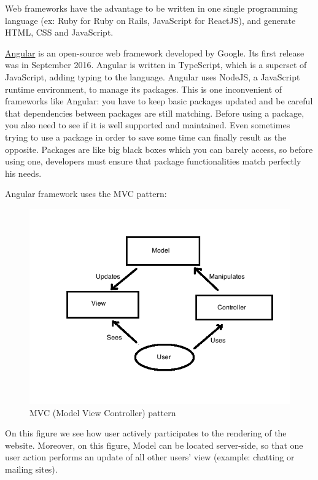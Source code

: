 \documentclass{article}
\begin{document}
                        Web frameworks have the advantage to be written in one single programming language (ex: Ruby for Ruby on Rails, JavaScript for ReactJS),
                        and generate HTML, CSS and JavaScript. \newline
                        

                        \href{https://angular.io/}{Angular} is an open-source web framework developed by Google. Its first release was
                        in September 2016. Angular is written in TypeScript, which is a superset of JavaScript, adding typing to the language.
                        Angular uses NodeJS, a JavaScript runtime environment, to manage its packages.
                        This is one inconvenient of frameworks like Angular: you have to keep basic packages updated and be careful that dependencies
                        between packages are still matching. Before using a package, you also need to see if it is well supported and maintained. Even sometimes
                        trying to use a package in order to save some time can finally result as the opposite. Packages are like big black boxes which you
                        can barely access, so before using one, developers must ensure that package functionalities match perfectly his needs.

                        Angular framework uses the MVC pattern:
                        \begin{figure}[H]
                            \includegraphics[width=\textwidth]{MVC.png}
                            \caption{MVC (Model View Controller) pattern}
                        \end{figure}
                        On this figure we see how user actively participates to the rendering of the website. Moreover, on this figure, Model
                        can be located server-side, so that one user action performs an update of all other users' view (example: chatting or mailing sites).\\
\end{document}

